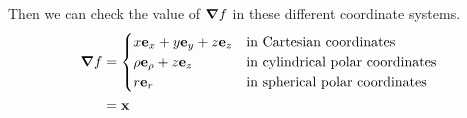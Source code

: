 Then we can check the value of \(\grad f\) in these different coordinate systems.
\begin{align*}
	\grad f & = \begin{cases}
		x \vb e_x + y \vb e_y + z \vb e_z & \text{in Cartesian coordinates}         \\
		\rho \vb e_\rho + z \vb e_z       & \text{in cylindrical polar coordinates} \\
		r \vb e_r                         & \text{in spherical polar coordinates}   \\
	\end{cases} \\
	        & = \vb x
\end{align*}
